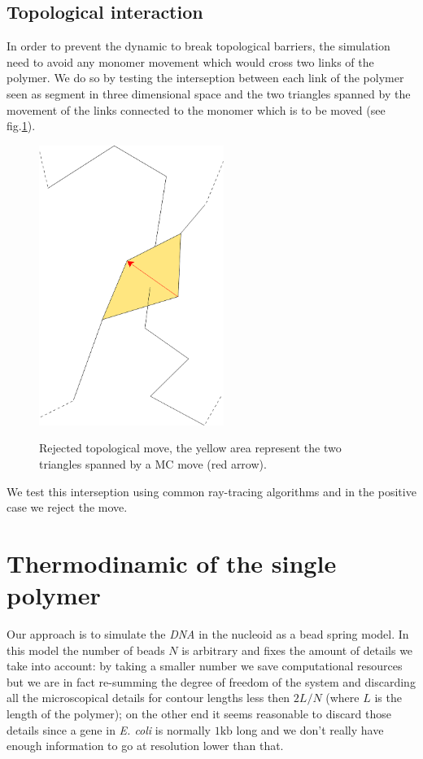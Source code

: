 \documentclass[12pt,a4paper,notitlepage]{article}
\newcommand{\ecoli}{\emph{E. coli}\xspace}
\newcommand{\dna}{\emph{DNA}\xspace}
\begin{document}
\subsection{Topological interaction}
In order to prevent the dynamic to break topological barriers, the
simulation need to avoid any monomer movement which would cross two
links of the polymer. We do so by testing the interseption between
each link of the polymer seen as segment in three dimensional space
and the two triangles spanned by the movement of the links connected
to the monomer which is to be moved (see fig.\ref{fig:triangolo}).
\begin{figure}[h!]
\centering
\includegraphics[angle=90,width=6cm]{triangolo}\\
\caption{Rejected topological move, the yellow area represent the
  two triangles spanned by a MC move (red arrow).}
\label{fig:triangolo}
\end{figure}
We test this interseption using common ray-tracing algorithms
\cite{Moeller1997} and in the positive case we reject the 
move.

\FloatBarrier
\section{Thermodinamic of the single polymer}

\label{par:parameters}
Our approach is to simulate the \dna in the nucleoid as a bead spring
model. In this model the number of beads $N$ is arbitrary and fixes
the amount of details we take into account: by taking a
smaller number we save computational resources but we are in fact
re-summing the degree of freedom of the system and discarding all the
microscopical details for contour lengths less then $2L/N$ (where $L$
is the length of the polymer); on the other end it seems reasonable to
discard those details since a gene in \ecoli is normally $1
\mathrm{kb}$ long and we don't really have enough information to go at
resolution lower than that.
\end{document}
